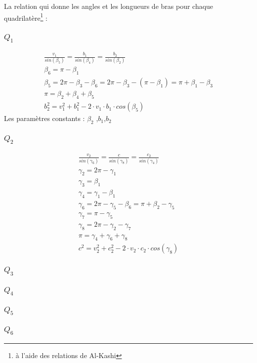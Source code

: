\documentclass[12pt,a4paper,twoside]{article}
\begin{document}
La relation qui donne les angles et les longueurs de bras pour chaque quadrilatère\footnote{à l'aide des relations de Al-Kashi} : 

\subsubsection{$Q_1$}
\begin{eqnarray}
\frac{v_1}{sin(\beta_5)}=\frac{b_1}{sin(\beta_4)}=\frac{b_2}{sin(\beta_2)}\\
\beta_6=\pi-\beta_1\\
\beta_5=2\pi-\beta_3-\beta_6=2\pi-\beta_3-(\pi-\beta_1)=\pi+\beta_1-\beta_3\\
\pi=\beta_2+\beta_4+\beta_5\\
b_2^2=v_1^2+b_1^2- 2 \cdot v_1 \cdot b_1 \cdot cos(\beta_5)
\end{eqnarray}
Les paramètres constants : $\beta_2$ ,$b_1$,$b_2$
\subsubsection{$Q_2$}
\begin{eqnarray}
\frac{v_2}{sin(\gamma_6)}=\frac{c}{sin(\gamma_8)}=\frac{c_2}{sin(\gamma_4)}\\
\gamma_2=2\pi-\gamma_1\\
\gamma_3=\beta_1\\
\gamma_4=\gamma_1-\beta_1\\
\gamma_6=2\pi-\gamma_5-\beta_6=\pi+\beta_2-\gamma_5\\
\gamma_7=\pi-\gamma_5\\
\gamma_8=2\pi-\gamma_2-\gamma_7\\
\pi=\gamma_4+\gamma_6+\gamma_8\\
c^2=v_2^2+c_2^2- 2 \cdot v_2 \cdot c_2 \cdot cos(\gamma_8)
\end{eqnarray}
\subsubsection{$Q_3$}

\subsubsection{$Q_4$}

\subsubsection{$Q_5$}

\subsubsection{$Q_6$}
\end{document}
